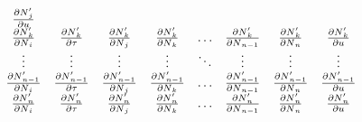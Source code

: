\begin{linenomath}
\begin{equation}
\begin{split}
\begin{array}{cccccccc}
        \frac{\partial \sepopsize[\rootpopindex]{}_j\proposed}{\partial \uniformdeviate} \\
        \frac{\partial \sepopsize[\rootpopindex]{}_k\proposed}{\partial \sepopsize[\rootpopindex]{}_i} &
        \frac{\partial \sepopsize[\rootpopindex]{}_k\proposed}{\partial \divtime} &
        \frac{\partial \sepopsize[\rootpopindex]{}_k\proposed}{\partial \sepopsize[\rootpopindex]{}_j} &
        \frac{\partial \sepopsize[\rootpopindex]{}_k\proposed}{\partial \sepopsize[\rootpopindex]{}_k} &
        \ldots &
        \frac{\partial \sepopsize[\rootpopindex]{}_k\proposed}{\partial \sepopsize[\rootpopindex]{}_{n-1}} &
        \frac{\partial \sepopsize[\rootpopindex]{}_k\proposed}{\partial \sepopsize[\rootpopindex]{}_n} &
        \frac{\partial \sepopsize[\rootpopindex]{}_k\proposed}{\partial \uniformdeviate} \\
        \vdots &
        \vdots &
        \vdots &
        \vdots &
        \ddots &
        \vdots &
        \vdots &
        \vdots \\
        \frac{\partial \sepopsize[\rootpopindex]{}_{n-1}\proposed}{\partial \sepopsize[\rootpopindex]{}_i} &
        \frac{\partial \sepopsize[\rootpopindex]{}_{n-1}\proposed}{\partial \divtime} &
        \frac{\partial \sepopsize[\rootpopindex]{}_{n-1}\proposed}{\partial \sepopsize[\rootpopindex]{}_j} &
        \frac{\partial \sepopsize[\rootpopindex]{}_{n-1}\proposed}{\partial \sepopsize[\rootpopindex]{}_k} &
        \ldots &
        \frac{\partial \sepopsize[\rootpopindex]{}_{n-1}\proposed}{\partial \sepopsize[\rootpopindex]{}_{n-1}} &
        \frac{\partial \sepopsize[\rootpopindex]{}_{n-1}\proposed}{\partial \sepopsize[\rootpopindex]{}_n} &
        \frac{\partial \sepopsize[\rootpopindex]{}_{n-1}\proposed}{\partial \uniformdeviate} \\
        \frac{\partial \sepopsize[\rootpopindex]{}_n\proposed}{\partial \sepopsize[\rootpopindex]{}_i} &
        \frac{\partial \sepopsize[\rootpopindex]{}_n\proposed}{\partial \divtime} &
        \frac{\partial \sepopsize[\rootpopindex]{}_n\proposed}{\partial \sepopsize[\rootpopindex]{}_j} &
        \frac{\partial \sepopsize[\rootpopindex]{}_n\proposed}{\partial \sepopsize[\rootpopindex]{}_k} &
        \ldots &
        \frac{\partial \sepopsize[\rootpopindex]{}_n\proposed}{\partial \sepopsize[\rootpopindex]{}_{n-1}} &
        \frac{\partial \sepopsize[\rootpopindex]{}_n\proposed}{\partial \sepopsize[\rootpopindex]{}_n} &
        \frac{\partial \sepopsize[\rootpopindex]{}_n\proposed}{\partial \uniformdeviate} \\

\end{array}
\end{split}
\end{equation}
\end{linenomath}
